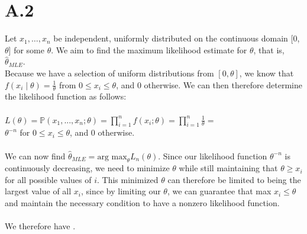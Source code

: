 \documentclass{article}
\newcommand{\1}{\mathbf{1}}
\renewcommand{\P}{\mathbb{P}}
\begin{document}
\section*{A.2}
{\Large 

Let $x_1, \dots, x_n$ be independent, uniformly distributed on the continuous domain [0, $\theta$] for some $\theta$. We aim to find the maximum likelihood estimate for $\theta$, that is, $\widehat{\theta}_{MLE}$. \\ 
Because we have a selection of uniform distributions from $[0, \theta]$, we know that $f(x_i \mid \theta) = \frac{1}{\theta}$ from $0 \leq x_i \leq \theta$, and 0 otherwise. We can then therefore determine the likelihood function as follows: \\ \\
$L(\theta) = \P(x_1, ..., x_n; \theta) = \prod_{i=1}^{n} f(x_i;\theta) = \prod_{i=1}^{n} \frac{1}{\theta} =$ \\
$ \theta^{-n}$ for $0 \leq x_i \leq \theta$, and 0 otherwise. \\ \\
We can now find $\widehat{\theta}_{MLE} = \text{arg max}_{\theta}L_n(\theta)$. Since our likelihood function $\theta^{-n}$ is continuously decreasing, we need to minimize $\theta$ while still maintaining that $\theta \geq x_i$ for all possible values of $i$. This minimized $\theta$ can therefore be limited to being the largest value of all $x_i$, since by limiting our $\theta$, we can guarantee that max $x_i \leq \theta$ and maintain the necessary condition to have a nonzero likelihood function. \\ \\
We therefore have .

}
\end{document}
